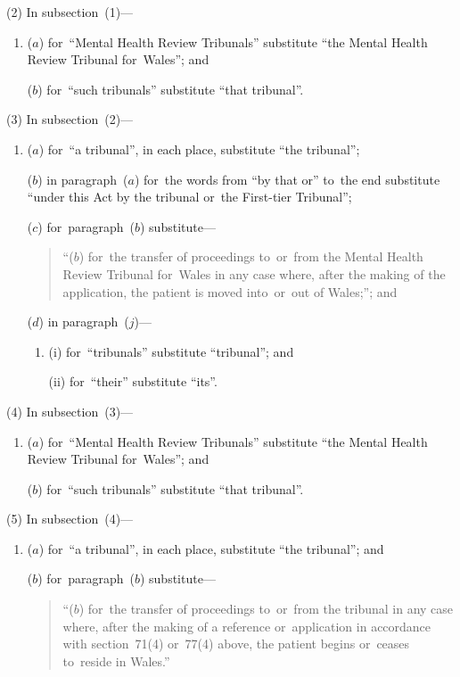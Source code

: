 \documentclass[12pt,a4paper]{article}
\begin{document}
(2) In subsection~(1)—
\begin{enumerate}\item[]
($a$) for~“Mental Health Review Tribunals” substitute “the Mental Health Review Tribunal for~Wales”; and

($b$) for~“such tribunals” substitute “that tribunal”.
\end{enumerate}

(3) In subsection~(2)—
\begin{enumerate}\item[]
($a$) for~“a tribunal”, in each place, substitute “the tribunal”;

($b$) in paragraph~($a$)  for~the words from “by that or” to~the end substitute “under this Act by the tribunal or~the First-tier Tribunal”;

($c$) for~paragraph~($b$)  substitute—
\begin{quotation}
“($b$) for~the transfer of proceedings to~or~from the Mental Health Review Tribunal for~Wales in any case where, after the making of the application, the patient is moved into~or~out of Wales;”; and
\end{quotation}

($d$) in paragraph~($j$)—
\begin{enumerate}\item[]
(i) for~“tribunals” substitute “tribunal”; and

(ii) for~“their” substitute “its”.
\end{enumerate}
\end{enumerate}

(4) In subsection~(3)—
\begin{enumerate}\item[]
($a$) for~“Mental Health Review Tribunals” substitute “the Mental Health Review Tribunal for~Wales”; and

($b$) for~“such tribunals” substitute “that tribunal”.
\end{enumerate}

(5) In subsection~(4)—
\begin{enumerate}\item[]
($a$) for~“a tribunal”, in each place, substitute “the tribunal”; and

($b$) for~paragraph~($b$)  substitute—
\begin{quotation}
“($b$) for~the transfer of proceedings to~or~from the tribunal in any case where, after the making of a reference or~application in accordance with section~71(4) or~77(4) above, the patient begins or~ceases to~reside in Wales.”
\end{quotation}
\end{enumerate}
\end{document}
